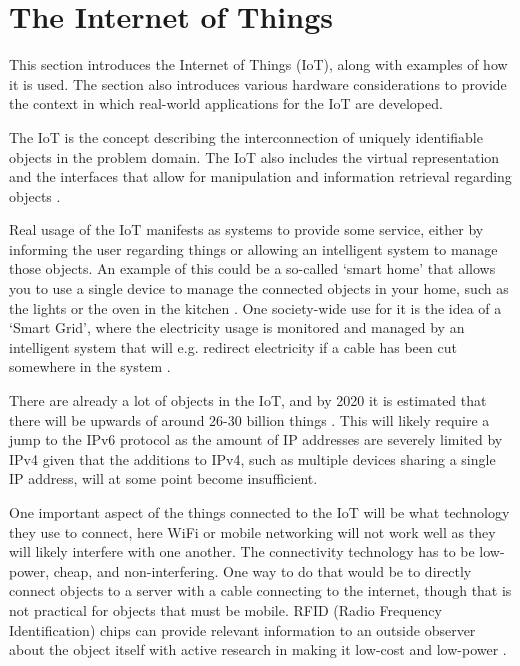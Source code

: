 \section{The Internet of Things}
This section introduces the Internet of Things (IoT), along with examples of how it is used. The section also introduces various hardware considerations to provide the context in which real-world applications for the IoT are developed.

The IoT is the concept describing the interconnection of uniquely identifiable objects in the problem domain.
The IoT also includes the virtual representation and the interfaces that allow for manipulation and information retrieval regarding objects \citep{misc:InternetOfThingsDefinition, misc:InternetOfThingsDefinition2, misc:InternetOfThingsDefinition3}.

Real usage of the IoT manifests as systems to provide some service, either by informing the user regarding things or allowing an intelligent system to manage those objects.
An example of this could be a so-called `smart home' that allows you to use a single device to manage the connected objects in your home, such as the lights or the oven in the kitchen \citep{misc:InternetOfThingsExamples}.
One society-wide use for it is the idea of a `Smart Grid', where the electricity usage is monitored and managed by an intelligent system that will e.g. redirect electricity if a cable has been cut somewhere in the system \citep{misc:smartGrid}.

There are already a lot of objects in the IoT, and by 2020 it is estimated that there will be upwards of around 26-30 billion things \citep{misc:IoTGrowth1,misc:IoTGrowth2}.
This will likely require a jump to the IPv6 protocol as the amount of IP addresses are severely limited by IPv4 \citep{misc:numberOfAddresses} given that the additions to IPv4, such as multiple devices sharing a single IP address, will at some point become insufficient.

One important aspect of the things connected to the IoT will be what technology they use to connect, here WiFi or mobile networking will not work well as they will likely interfere with one another.
The connectivity technology has to be low-power, cheap, and non-interfering.
One way to do that would be to directly connect objects to a server with a cable connecting to the internet, though that is not practical for objects that must be mobile.
RFID (Radio Frequency Identification) chips can provide relevant information to an outside observer about the object itself \citep{misc:rfid} with active research in making it low-cost and low-power \citep{misc:rfid2}.

